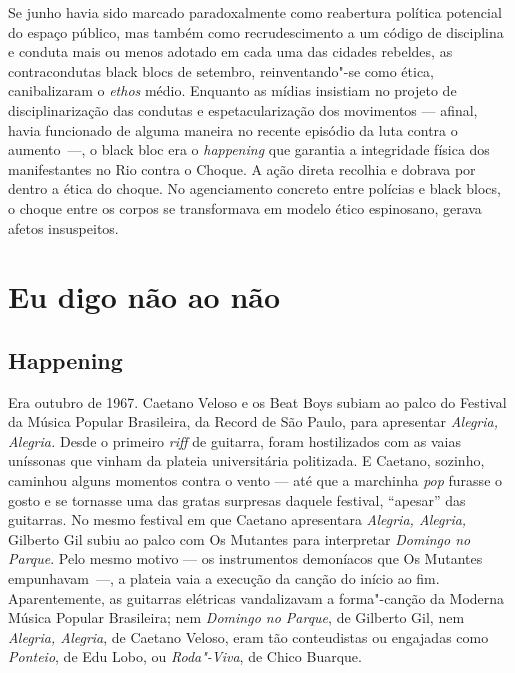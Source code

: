 Se junho havia sido marcado paradoxalmente como reabertura política
potencial do espaço público, mas também como recrudescimento a um código
de disciplina e conduta mais ou menos adotado em cada uma das cidades
rebeldes, as contracondutas black blocs de setembro, reinventando"-se
como ética, canibalizaram o \emph{ethos} médio. Enquanto as mídias
insistiam no projeto de disciplinarização das condutas e
espetacularização dos movimentos --- afinal, havia funcionado de alguma
maneira no recente episódio da luta contra o aumento~---, o black bloc
era o \emph{happening }que garantia a integridade física dos
manifestantes no Rio contra o Choque. A ação direta recolhia e dobrava
por dentro a ética do choque. No agenciamento concreto entre polícias e
black blocs, o choque entre os corpos se transformava em modelo ético
espinosano, gerava afetos insuspeitos.


\section{Eu digo não ao não}

\subsection{Happening}

Era outubro de 1967. Caetano Veloso e os Beat Boys
subiam ao palco do  Festival da Música Popular Brasileira, da 
Record de São Paulo, para apresentar \emph{Alegria, Alegria. }Desde o
primeiro \emph{riff} de guitarra, foram hostilizados com as vaias
uníssonas que vinham da plateia universitária politizada. E Caetano,
sozinho, caminhou alguns momentos contra o vento --- até que a marchinha
\emph{pop} furasse o gosto e se tornasse uma das gratas surpresas
daquele festival, ``apesar'' das guitarras. No mesmo festival em que
Caetano apresentara \emph{Alegria, Alegria,} Gilberto Gil subiu ao palco
com Os Mutantes para interpretar \emph{Domingo no Parque}. Pelo mesmo
motivo --- os instrumentos demoníacos que Os Mutantes empunhavam~---, a
plateia vaia a execução da canção do início ao fim. Aparentemente, as
guitarras elétricas vandalizavam a forma"-canção da Moderna Música
Popular Brasileira; nem \emph{Domingo no Parque}, de Gilberto Gil, nem
\emph{Alegria, Alegria}, de Caetano Veloso, eram tão conteudistas ou
engajadas como \emph{Ponteio}, de Edu Lobo, ou \emph{Roda"-Viva},
de Chico Buarque.

